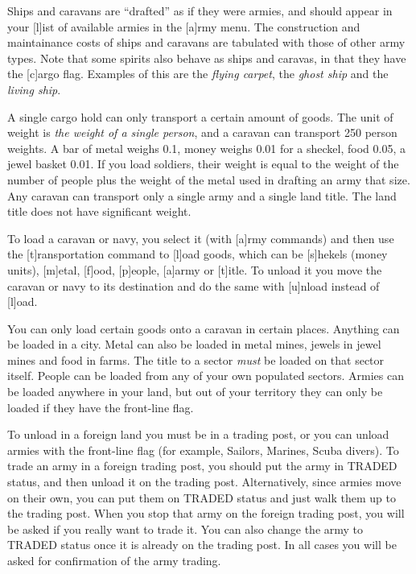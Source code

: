 Ships and caravans are ``drafted'' as if they were armies, and should
appear in your [l]ist of available armies in the [a]rmy menu.  The
construction and maintainance costs of ships and caravans are
tabulated with those of other army types.  Note that some spirits also
behave as ships and caravas, in that they have the [c]argo flag.
Examples of this are the \emph{flying carpet}, the \emph{ghost ship}
and the \emph{living ship}.

A single cargo hold can only transport a certain amount of goods.  The
unit of weight is \emph{the weight of a single person}, and a caravan
can transport 250 person weights.  A bar of metal weighs 0.1, money
weighs 0.01 for a sheckel, food 0.05, a jewel basket 0.01.  If you
load soldiers, their weight is equal to the weight of the number of
people plus the weight of the metal used in drafting an army that
size.  Any caravan can transport only a single army and a single land
title.  The land title does not have significant weight.

To load a caravan or navy, you select it (with [a]rmy commands) and
then use the [t]ransportation command to [l]oad goods, which can be
[s]hekels (money units), [m]etal, [f]ood, [p]eople, [a]army or
[t]itle.  To unload it you move the caravan or navy to its destination
and do the same with [u]nload instead of [l]oad.

You can only load certain goods onto a caravan in certain places.
Anything can be loaded in a city.  Metal can also be loaded in metal
mines, jewels in jewel mines and food in farms.  The title to a sector
\emph{must} be loaded on that sector itself.  People can be loaded
from any of your own populated sectors.  Armies can be loaded anywhere
in your land, but out of your territory they can only be loaded if
they have the front-line flag.

To unload in a foreign land you must be in a trading post, or you can
unload armies with the front-line flag (for example, Sailors, Marines,
Scuba divers).  To trade an army in a foreign trading post, you should
put the army in TRADED status, and then unload it on the trading post.
Alternatively, since armies move on their own, you can put them on
TRADED status and just walk them up to the trading post.  When you
stop that army on the foreign trading post, you will be asked if you
really want to trade it.  You can also change the army to TRADED
status once it is already on the trading post.  In all cases you will
be asked for confirmation of the army trading.

